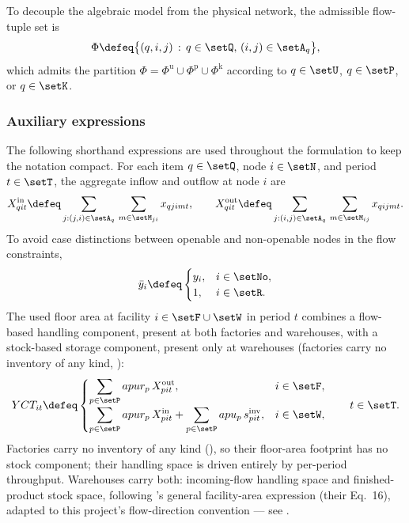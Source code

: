 To decouple the algebraic model from the physical network, the
admissible flow-tuple set is
\begin{equation}
\Phi \defeq
\bigl\{(q,i,j)\,:\, q\in\setQ,\,(i,j)\in\setA_q\bigr\},
\label{eq:phi}
\end{equation}
which admits the partition
$\Phi=\Phi^{\mathrm{u}}\cup\Phi^{\mathrm{p}}\cup\Phi^{\mathrm{k}}$
according to $q\in\setU$, $q\in\setP$, or $q\in\setK$.

\subsubsection{Auxiliary expressions}
\label{sec:model:auxiliary}

The following shorthand expressions are used throughout the
formulation to keep the notation compact. For each item $q\in\setQ$,
node $i\in\setN$, and period $t\in\setT$, the aggregate inflow and
outflow at node $i$ are
\begin{equation}
X^{\mathrm{in}}_{qit} \defeq
  \sum_{j:(j,i)\in\setA_q}\,\sum_{m\in\setM_{ji}} x_{qjimt},
\qquad
X^{\mathrm{out}}_{qit} \defeq
  \sum_{j:(i,j)\in\setA_q}\,\sum_{m\in\setM_{ij}} x_{qijmt}.
\label{eq:flows}
\end{equation}
To avoid case distinctions between openable and non-openable nodes
in the flow constraints,
\begin{equation}
\bar{y}_{i} \defeq
\begin{cases}
y_{i}, & i\in\setNo,\\
1,     & i\in\setR.
\end{cases}
\label{eq:ybar}
\end{equation}
The used floor area at facility $i\in\setF\cup\setW$ in period $t$
combines a flow-based handling component, present at both factories
and warehouses, with a stock-based storage component, present only at
warehouses (factories carry no inventory of any kind,
):
\begin{equation}
YCT_{it} \defeq
\begin{cases}
\displaystyle\sum_{p\in\setP} apur_p\,X^{\mathrm{out}}_{pit},
  & i\in\setF,\\[1.1em]
\displaystyle
\sum_{p\in\setP} apur_p\,X^{\mathrm{in}}_{pit}
  + \sum_{p\in\setP} apu_p\,s^{\mathrm{inv}}_{pit},
  & i\in\setW,
\end{cases}
\qquad t\in\setT.
\label{eq:YCT}
\end{equation}
Factories carry no inventory of any kind (), so
their floor-area footprint has no stock component; their handling
space is driven entirely by per-period throughput. Warehouses carry
both: incoming-flow handling space and finished-product stock space,
following \citet{mota2018}'s general facility-area expression (their
Eq.~16), adapted to this project's flow-direction convention --- see
.
